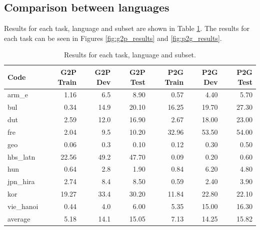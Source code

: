 \documentclass[11pt,a4paper]{article}
\begin{document}
\subsection{Comparison between languages}

Results for each task, language and subset are shown in Table \ref{tab:results}. The results for each task can be seen in Figures \ref{fig:g2p_results} and \ref{fig:p2g_results}.

\begin{table}[ht]
\centering
\begin{tabular}{lrrrrrr}
\toprule
      Code &  G2P Train &  G2P Dev &  G2P Test &  P2G Train &  P2G Dev &  P2G Test \\
\midrule
     arm\_e &       1.16 &      6.5 &      8.90 &       0.57 &     4.40 &      5.70 \\
       bul &       0.34 &     14.9 &     20.10 &      16.25 &    19.70 &     27.30 \\
       dut &       2.59 &     12.0 &     16.90 &       2.67 &    18.00 &     23.00 \\
       fre &       2.04 &      9.5 &     10.20 &      32.96 &    53.50 &     54.00 \\
       geo &       0.06 &      0.3 &      0.10 &       0.12 &     0.30 &      0.50 \\
  hbs\_latn &      22.56 &     49.2 &     47.70 &       0.09 &     0.20 &      0.60 \\
       hun &       0.64 &      2.8 &      1.90 &       0.84 &     6.20 &      4.80 \\
  jpn\_hira &       2.74 &      8.4 &      8.50 &       0.59 &     2.40 &      3.90 \\
       kor &      19.27 &     33.4 &     30.20 &      11.84 &    22.80 &     22.10 \\
 vie\_hanoi &       0.44 &      4.0 &      6.00 &       5.35 &    15.00 &     16.30 \\
 \midrule
   average &       5.18 &     14.1 &     15.05 &       7.13 &    14.25 &     15.82 \\
\bottomrule
\end{tabular}
\caption{Results for each task, language and subset.}
\label{tab:results}
\end{table}
\end{document}
